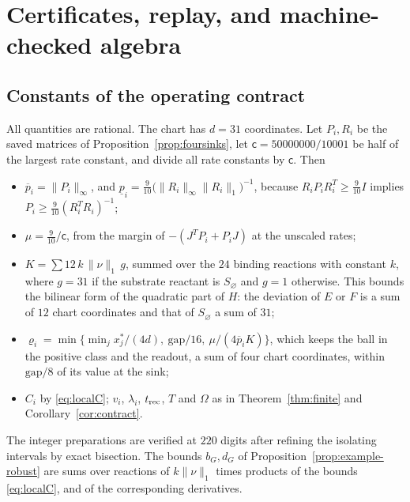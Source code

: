 \section{Certificates, replay, and machine-checked algebra}\label{app:certificates}

\subsection{Constants of the operating contract}
All quantities are rational. The chart has \(d=31\) coordinates. Let \(P_i,R_i\) be the saved
matrices of Proposition~\ref{prop:foursinks}, let \(\mathsf c=50000000/10001\) be half of the
largest rate constant, and divide all rate constants by \(\mathsf c\). Then
\begin{itemize}
\item \(\overline p_i=\|P_i\|_\infty\), and
\(\underline p_i=\tfrac9{10}\bigl(\|R_i\|_\infty\|R_i\|_1\bigr)^{-1}\), because
\(R_iP_iR_i^T\ge\tfrac9{10}I\) implies \(P_i\ge\tfrac9{10}(R_i^TR_i)^{-1}\);
\item \(\mu=\tfrac9{10}/\mathsf c\), from the margin of \(-(J^TP_i+P_iJ)\) at the unscaled
rates;
\item \(K=\sum12\,k\,\|\nu\|_1\,g\), summed over the \(24\) binding reactions with constant
\(k\), where \(g=31\) if the substrate reactant is \(S_\varnothing\) and \(g=1\) otherwise.
This bounds the bilinear form of the quadratic part of \(H\): the deviation of \(E\) or \(F\)
is a sum of \(12\) chart coordinates and that of \(S_\varnothing\) a sum of \(31\);
\item \(\varrho_i=\min\{\min_jx^*_j/(4d),\ \mathrm{gap}/16,\ \mu/(4\overline p_iK)\}\), which
keeps the ball in the positive class and the readout, a sum of four chart coordinates, within
\(\mathrm{gap}/8\) of its value at the sink;
\item \(C_i\) by \eqref{eq:localC}; \(v_i\), \(\lambda_i\), \(t_{\mathrm{rec}}\), \(T\) and \(\Omega\) as in
Theorem~\ref{thm:finite} and Corollary~\ref{cor:contract}.
\end{itemize}
The integer preparations are verified at \(220\) digits after refining the isolating intervals
by exact bisection. The bounds \(b_G,d_G\) of Proposition~\ref{prop:example-robust} are sums
over reactions of \(k\|\nu\|_1\) times products of the bounds \eqref{eq:localC}, and of the
corresponding derivatives.

